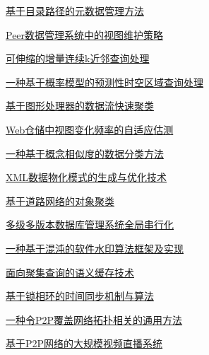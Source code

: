 \documentclass[a4paper]{article}
\begin{document}
\href{http://www.jos.org.cn/ch/reader/download_pdf.aspx?file_no=20070208&year_id=2007&quarter_id=2&falg=1}{基于目录路径的元数据管理方法}

\href{http://www.jos.org.cn/ch/reader/download_pdf.aspx?file_no=20070210&year_id=2007&quarter_id=2&falg=1}{Peer数据管理系统中的视图维护策略}

\href{http://www.jos.org.cn/ch/reader/download_pdf.aspx?file_no=20070211&year_id=2007&quarter_id=2&falg=1}{可伸缩的增量连续k近邻查询处理}

\href{http://www.jos.org.cn/ch/reader/download_pdf.aspx?file_no=20070212&year_id=2007&quarter_id=2&falg=1}{一种基于概率模型的预测性时空区域查询处理}

\href{http://www.jos.org.cn/ch/reader/download_pdf.aspx?file_no=20070213&year_id=2007&quarter_id=2&falg=1}{基于图形处理器的数据流快速聚类}

\href{http://www.jos.org.cn/ch/reader/download_pdf.aspx?file_no=20070214&year_id=2007&quarter_id=2&falg=1}{Web仓储中视图变化频率的自适应估测}

\href{http://www.jos.org.cn/ch/reader/download_pdf.aspx?file_no=20070215&year_id=2007&quarter_id=2&falg=1}{一种基于概念相似度的数据分类方法}

\href{http://www.jos.org.cn/ch/reader/download_pdf.aspx?file_no=20070216&year_id=2007&quarter_id=2&falg=1}{XML数据物化模式的生成与优化技术}

\href{http://www.jos.org.cn/ch/reader/download_pdf.aspx?file_no=20070217&year_id=2007&quarter_id=2&falg=1}{基于道路网络的对象聚类}

\href{http://www.jos.org.cn/ch/reader/download_pdf.aspx?file_no=20070218&year_id=2007&quarter_id=2&falg=1}{多级多版本数据库管理系统全局串行化}

\href{http://www.jos.org.cn/ch/reader/download_pdf.aspx?file_no=20070219&year_id=2007&quarter_id=2&falg=1}{一种基于混沌的软件水印算法框架及实现}

\href{http://www.jos.org.cn/ch/reader/download_pdf.aspx?file_no=20070220&year_id=2007&quarter_id=2&falg=1}{面向聚集查询的语义缓存技术}

\href{http://www.jos.org.cn/ch/reader/download_pdf.aspx?file_no=20070221&year_id=2007&quarter_id=2&falg=1}{基于锁相环的时间同步机制与算法}

\href{http://www.jos.org.cn/ch/reader/download_pdf.aspx?file_no=20070222&year_id=2007&quarter_id=2&falg=1}{一种令P2P覆盖网络拓扑相关的通用方法}

\href{http://www.jos.org.cn/ch/reader/download_pdf.aspx?file_no=20070223&year_id=2007&quarter_id=2&falg=1}{基于P2P网络的大规模视频直播系统}
\end{document}
